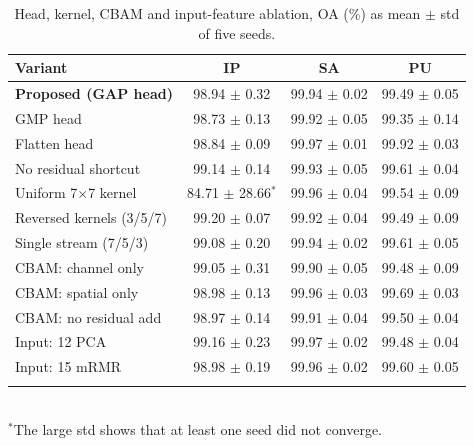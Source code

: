 \documentclass[conference]{IEEEtran}
\begin{document}
	\begin{table}[t]
		\centering
		\caption{Head, kernel, CBAM and input-feature ablation, OA (\%) as mean $\pm$ std of five seeds.}
		\label{ablation2}
		\renewcommand*\arraystretch{1.05}
		\footnotesize
		\setlength{\tabcolsep}{1.8pt}
		\begin{tabular}{@{}lccc@{}}
			\toprule
			Variant & IP & SA & PU \\ \midrule
			\textbf{Proposed (GAP head)} & 98.94 $\pm$ 0.32 & 99.94 $\pm$ 0.02 & 99.49 $\pm$ 0.05 \\
			GMP head & 98.73 $\pm$ 0.13 & 99.92 $\pm$ 0.05 & 99.35 $\pm$ 0.14 \\
			Flatten head & 98.84 $\pm$ 0.09 & 99.97 $\pm$ 0.01 & 99.92 $\pm$ 0.03 \\
			\midrule
			No residual shortcut & 99.14 $\pm$ 0.14 & 99.93 $\pm$ 0.05 & 99.61 $\pm$ 0.04 \\
			Uniform 7$\times$7 kernel & 84.71 $\pm$ 28.66$^{*}$ & 99.96 $\pm$ 0.04 & 99.54 $\pm$ 0.09 \\
			Reversed kernels (3/5/7) & 99.20 $\pm$ 0.07 & 99.92 $\pm$ 0.04 & 99.49 $\pm$ 0.09 \\
			Single stream (7/5/3) & 99.08 $\pm$ 0.20 & 99.94 $\pm$ 0.02 & 99.61 $\pm$ 0.05 \\
			\midrule
			CBAM: channel only & 99.05 $\pm$ 0.31 & 99.90 $\pm$ 0.05 & 99.48 $\pm$ 0.09 \\
			CBAM: spatial only & 98.98 $\pm$ 0.13 & 99.96 $\pm$ 0.03 & 99.69 $\pm$ 0.03 \\
			CBAM: no residual add & 98.97 $\pm$ 0.14 & 99.91 $\pm$ 0.04 & 99.50 $\pm$ 0.04 \\
			\midrule
			Input: 12 PCA & 99.16 $\pm$ 0.23 & 99.97 $\pm$ 0.02 & 99.48 $\pm$ 0.04 \\
			Input: 15 mRMR & 98.98 $\pm$ 0.19 & 99.96 $\pm$ 0.02 & 99.60 $\pm$ 0.05 \\ \\ \bottomrule
		\end{tabular}\\[3pt]
		{\scriptsize $^{*}$The large std shows that at least one seed did not converge.}
	\end{table}
	
\end{document}

